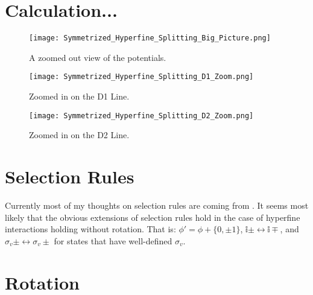 \documentclass[prl, longbibliography]{revtex4-2}
\begin{document}
\section{Calculation...}

\begin{figure}
  \texttt{[image: Symmetrized\_Hyperfine\_Splitting\_Big\_Picture.png]}
  \caption{A zoomed out view of the potentials.}
  \label{fig:boat1}
\end{figure}
\begin{figure}
  \texttt{[image: Symmetrized\_Hyperfine\_Splitting\_D1\_Zoom.png]}
  \caption{Zoomed in on the D1 Line.}
  \label{fig:boat1}
\end{figure}
\begin{figure}
  \texttt{[image: Symmetrized\_Hyperfine\_Splitting\_D2\_Zoom.png]}
  \caption{Zoomed in on the D2 Line.}
  \label{fig:boat1}
\end{figure}


\section{Selection Rules}
Currently most of my thoughts on selection rules are coming from \cite{herzberg_spectra_1939}. It seems most likely that the obvious extensions of selection rules hold in the case of hyperfine interactions holding without rotation. That is: $\phi'=\phi+\{0,\pm 1\}$, $\mathbb{i}\pm\leftrightarrow\mathbb{i}\mp$, and $\sigma_v\pm\leftrightarrow\sigma_v\pm$ for states that have well-defined $\sigma_v$. 

\section{Rotation}
\end{document}
